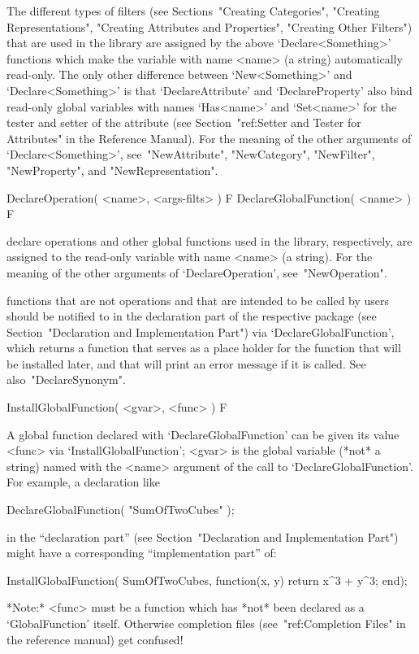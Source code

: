 The different types of filters (see Sections~"Creating Categories",
"Creating Representations", "Creating Attributes and Properties",
"Creating Other Filters") that are used in the {\GAP} library are
assigned by the above `Declare<Something>' functions which make the
variable with name <name> (a string) automatically read-only.
The only other difference between `New<Something>' and
`Declare<Something>' is that `DeclareAttribute' and `DeclareProperty'
also bind read-only global variables with names `Has<name>' and `Set<name>'
for the tester and setter of the attribute
(see Section~"ref:Setter and Tester for Attributes" in the Reference Manual).
For the meaning of the other arguments of `Declare<Something>',
see~"NewAttribute", "NewCategory", "NewFilter", "NewProperty", and
"NewRepresentation".

\>DeclareOperation( <name>, <args-filts> ) F
\>DeclareGlobalFunction( <name> ) F

declare operations and other global functions used in the {\GAP} library,
respectively,
are assigned to the read-only variable with name <name> (a string).
For the meaning of the other arguments of `DeclareOperation',
see~"NewOperation".

{\GAP} functions that are not operations and that are intended to be
called by users should be notified to {\GAP} in the declaration part
of the respective package
(see Section~"Declaration and Implementation Part")
via `DeclareGlobalFunction', which returns a function that serves as a
place holder for the function that will be installed later,
and that will print an error message if it is called.
See also~"DeclareSynonym".

\>InstallGlobalFunction( <gvar>, <func> ) F

A global function declared with `DeclareGlobalFunction' can be given its
value <func> via `InstallGlobalFunction'; 
<gvar> is the global variable (*not* a string) named with the 
<name> argument of the call to `DeclareGlobalFunction'. For example,
a declaration like

\begintt
DeclareGlobalFunction( "SumOfTwoCubes" );
\endtt

in the ``declaration part'' (see Section~"Declaration and Implementation
Part") might have a corresponding ``implementation part'' of:

\begintt
InstallGlobalFunction( SumOfTwoCubes, function(x, y) return x^3 + y^3; end);
\endtt

*Note:* <func> must be a function which has *not* been declared as a
`GlobalFunction' itself. Otherwise completion files
(see~"ref:Completion Files" in the reference manual) get confused!

